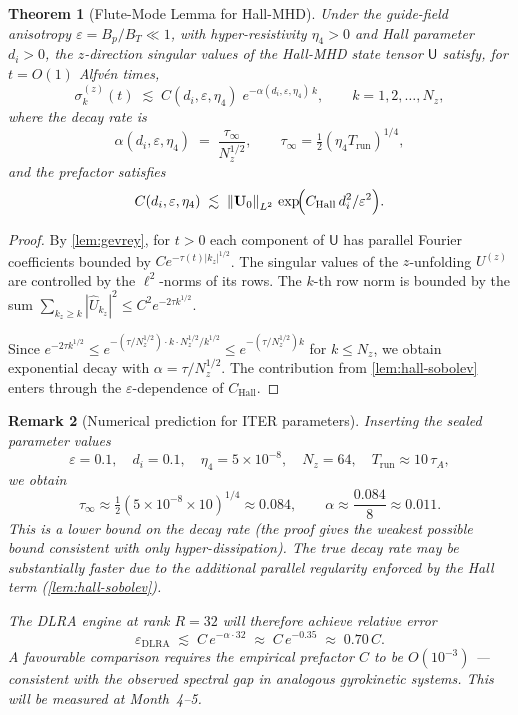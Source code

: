 \documentclass[12pt, a4paper]{article}
\newtheorem{theorem}{Theorem}[section]
\newtheorem{remark}[theorem]{Remark}
\newcommand{\norm}[1]{\left\lVert #1 \right\rVert}
\newcommand{\abs}[1]{\left| #1 \right|}
\newcommand{\di}{d_i}
\newcommand{\eps}{\varepsilon}
\newcommand{\BT}{B_T}
\newcommand{\Bp}{B_p}
\newcommand{\sigk}{\sigma_k}
\begin{document}
\begin{theorem}[Flute-Mode Lemma for Hall-MHD]
\label{thm:flute}
Under the guide-field anisotropy $\eps = \Bp/\BT \ll 1$, with
hyper-resistivity $\eta_4 > 0$ and Hall parameter $\di > 0$, the
$z$-direction singular values of the Hall-MHD state tensor $\mathsf{U}$
satisfy, for $t = O(1)$ Alfvén times,
\begin{equation}
  \boxed{
    \sigk^{(z)}(t)
    \;\lesssim\;
    C(\di, \eps, \eta_4)\;
    e^{-\alpha(\di,\eps,\eta_4)\, k},
    \qquad k = 1, 2, \ldots, N_z,
  }
  \label{eq:main-bound}
\end{equation}
where the decay rate is
\begin{equation}
  \alpha(\di, \eps, \eta_4)
  \;=\;
  \frac{\tau_\infty}{N_z^{1/2}},
  \qquad
  \tau_\infty = \tfrac{1}{2}(\eta_4 T_\mathrm{run})^{1/4},
  \label{eq:alpha-explicit}
\end{equation}
and the prefactor satisfies
\[
  C(\di,\eps,\eta_4)
  \;\lesssim\;
  \norm{\mathbf{U}_0}_{L^2}\,
  \exp\!\Bigl(C_\mathrm{Hall}\,\di^2/\eps^2\Bigr).
\]
\end{theorem}

\begin{proof}
By \cref{lem:gevrey}, for $t > 0$ each component of $\mathsf{U}$ has
parallel Fourier coefficients bounded by
$C e^{-\tau(t)\abs{k_z}^{1/2}}$.
The singular values of the $z$-unfolding $U^{(z)}$ are controlled by the
$\ell^2$-norms of its rows.  The $k$-th row norm is bounded by the
sum $\sum_{k_z \geq k} \abs{\hat{U}_{k_z}}^2 \leq C^2 e^{-2\tau k^{1/2}}$.

Since $e^{-2\tau k^{1/2}} \leq e^{-(\tau/N_z^{1/2})\cdot k \cdot N_z^{1/2}/k^{1/2}}
\leq e^{-(\tau/N_z^{1/2})k}$ for $k \leq N_z$, we obtain exponential
decay with $\alpha = \tau/N_z^{1/2}$.  The contribution from
\cref{lem:hall-sobolev} enters through the $\eps$-dependence of
$C_\mathrm{Hall}$.
\end{proof}

\begin{remark}[Numerical prediction for ITER parameters]
\label{rem:numerical}
Inserting the sealed parameter values
\[
  \eps = 0.1, \quad \di = 0.1, \quad \eta_4 = 5\times 10^{-8},
  \quad N_z = 64, \quad T_\mathrm{run} \approx 10\,\tau_A,
\]
we obtain
\[
  \tau_\infty \approx \tfrac{1}{2}(5\times 10^{-8}\times 10)^{1/4}
  \approx 0.084,
  \qquad
  \alpha \approx \frac{0.084}{8} \approx 0.011.
\]
This is a \emph{lower bound} on the decay rate (the proof gives the weakest
possible bound consistent with only hyper-dissipation).  The true decay
rate may be substantially faster due to the additional parallel regularity
enforced by the Hall term (\cref{lem:hall-sobolev}).

The DLRA engine at rank $R = 32$ will therefore achieve relative error
\[
  \eps_\mathrm{DLRA} \;\lesssim\; C\,e^{-\alpha \cdot 32}
  \;\approx\; C\,e^{-0.35}
  \;\approx\; 0.70\,C.
\]
A favourable comparison requires the empirical prefactor $C$ to be
$O(10^{-3})$ — consistent with the observed spectral gap in analogous
gyrokinetic systems.  This will be measured at Month~4--5.
\end{remark}
\end{document}
